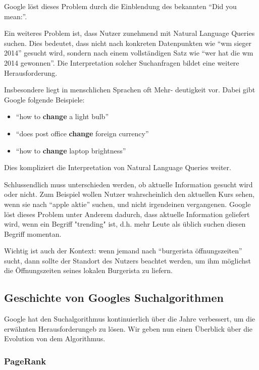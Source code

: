 \documentclass{article}
\begin{document}
Google löst dieses Problem durch die Einblendung des bekannten ``Did you mean:''.

Ein weiteres Problem ist, dass Nutzer zunehmend mit Natural Language Queries suchen. Dies bedeutet, dass nicht nach konkreten Datenpunkten wie ``wm sieger 2014'' gesucht wird, sondern nach einem vollständigen Satz wie ``wer hat die wm 2014 gewonnen''. Die Interpretation solcher Suchanfragen bildet eine weitere Herausforderung.

Insbesondere liegt in menschlichen Sprachen oft Mehr- deutigkeit vor. Dabei gibt Google folgende Beispiele\cite{sa}:

\begin{itemize}
    \item ``how to \textbf{change} a light bulb''
    \item ``does post office \textbf{change} foreign currency''
    \item ``how to \textbf{change} laptop brightness''
\end{itemize}

Dies kompliziert die Interpretation von Natural Language Queries weiter.

Schlussendlich muss unterschieden werden, ob aktuelle Information gesucht wird oder nicht. Zum Beispiel wollen Nutzer wahrscheinlich den aktuellen Kurs sehen, wenn sie nach ``apple aktie'' suchen, und nicht irgendeinen vergangenen. Google löst dieses Problem unter Anderem dadurch, dass aktuelle Information geliefert wird, wenn ein Begriff "trending" ist, d.h. mehr Leute als üblich suchen diesen Begriff momentan.

Wichtig ist auch der Kontext: wenn jemand nach ``burgerista öffnungszeiten'' sucht, dann sollte der Standort des Nutzers beachtet werden, um ihm möglichst die Öffnungszeiten seines lokalen Burgerista zu liefern.

\subsection{Geschichte von Googles Suchalgorithmen}
        
Google hat den Suchalgorithmus kontinuierlich über die Jahre verbessert, um die erwähnten Herausforderungeb zu lösen. Wir geben nun einen Überblick über die Evolution von dem Algorithmus.
        
\subsubsection{PageRank}
\end{document}
